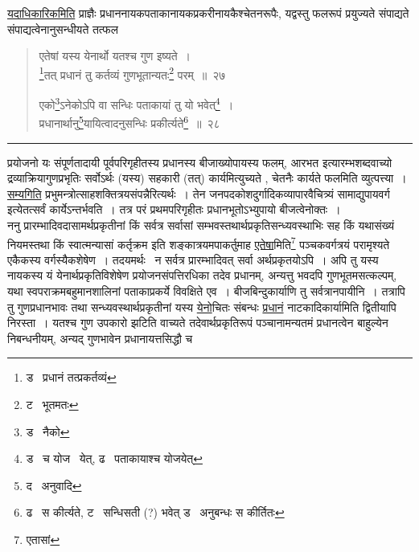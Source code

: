 \documentclass[11pt, openany]{book}
\begin{document}
\underline{यदाधिकारिकमिति} प्राज्ञैः प्रधाननायकपताकानायकप्रकरीनायकैश्चेतनरूपैः, यद्वस्तु फलरूपं प्रयुज्यते संपाद्यते संपाद्यत्वेनानुसन्धीयते तत्फल \textendash\

\newpage

\begin{quote}
{\na एतेषां यस्य येनार्थो यतश्च गुण इष्यते~।\\
\renewcommand{\thefootnote}{1}\footnote{ड \textendash\ प्रधानं तत्प्रकर्तव्यं}तत् प्रधानं तु कर्तव्यं गुणभूतान्यतः\renewcommand{\thefootnote}{2}\footnote{ट \textendash\ भूतमतः} परम्~॥~२७

एको\renewcommand{\thefootnote}{3}\footnote{ड \textendash\ नैको}ऽनेकोऽपि वा सन्धिः पताकायां तु यो भवेत्\renewcommand{\thefootnote}{4}\footnote{ड \textendash\ च योज \textendash\ येत्, ढ \textendash\ पताकायाश्च योजयेत्}~।\\
प्रधानार्थानु\renewcommand{\thefootnote}{5}\footnote{द \textendash\ अनुवादि}यायित्वादनुसन्धिः प्रकीर्त्यते\renewcommand{\thefootnote}{6}\footnote{ढ \textendash\ स कीर्त्यते, ट \textendash\ सन्धिसती (?) भवेत् ड \textendash\ अनुबन्धः स कीर्तितः}~॥~२८}
\end{quote}

\hrule

\vspace{2mm}
\noindent
प्रयोजनो यः संपूर्णतादायी पूर्वपरिगृहीतस्य प्रधानस्य बीजाख्योपायस्य फलम्, आरभत इत्यारम्भशब्दवाच्यो द्रव्याक्रियागुणप्रभृतिः सर्वोऽर्थः (यस्य) सहकारी (तत्) कार्यमित्युच्यते , चेतनैः कार्यते फलमिति व्युत्पत्त्या~। \underline{सम्यगिति} प्रभुमन्त्रोत्साहशक्तित्रयसंपन्नैरित्यर्थः~। तेन जनपदकोशदुर्गादिकव्यापारवैचित्र्यं सामाद्युपायवर्ग इत्येतत्सर्वं कार्येऽन्तर्भवति~। तत्र परं प्रथमपरिगृहीतः प्रधानभूतोऽभ्युपायो बीजत्वेनोक्तः~।\\

ननु प्रारम्भादिवदासामर्थप्रकृतीनां किं सर्वत्र सर्वासां सम्भवस्तथार्थप्रकृतिसन्ध्यवस्थाभिः सह किं यथासंख्यं नियमस्तथा किं स्वात्मन्यासां कर्तृक्रम इति शङ्कात्रयमपाकर्तुमाह \underline{एतेषा}मिति\renewcommand{\thefootnote}{1}\footnote{एतासां} पञ्चकवर्गत्रयं परामृश्यते एकैकस्य वर्गस्यैकशेषेण~। तदयमर्थः \textendash\ न सर्वत्र प्रारम्भादिवत् सर्वा अर्थप्रकृतयोऽपि~। अपि तु यस्य नायकस्य यं येनार्थप्रकृतिविशेषेण प्रयोजनसंपत्तिरधिका तदेव प्रधानम्, अन्यत्तु भवदपि गुणभूतमसत्कल्पम्, यथा स्वपराक्रमबहुमानशालिनां पताकाप्रकर्ये विवक्षिते एव~। बीजबिन्दुकार्याणि तु सर्वत्रानपायीनि~। तत्रापि तु गुणप्रधानभावः तथा सन्ध्यवस्थार्थप्रकृतीनां यस्य \underline{येनो}चितः संबन्धः \underline{प्रधानं} नाटकादिकार्यामिति द्वितीयापि निरस्ता~। यतश्च गुण उपकारो झटिति वाच्यते तदेवार्थप्रकृतिरूपं पञ्चानामन्यतमं प्रधानत्वेन बाहुल्येन निबन्धनीयम्, अन्यद् गुणभावेन प्रधानायत्तसिद्धौ च
\end{document}
